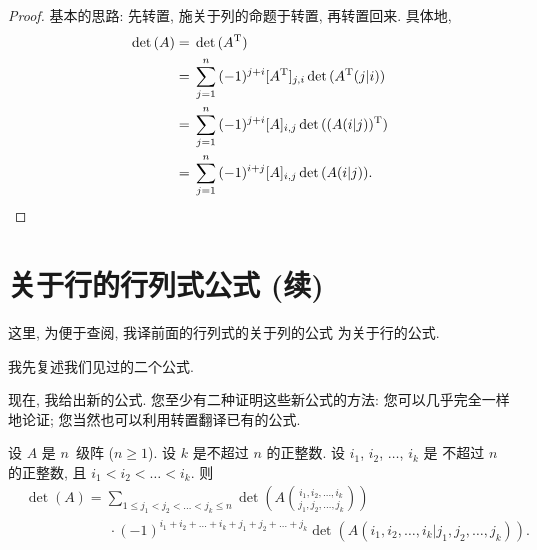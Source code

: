 \documentclass[%
    UTF8,%
    fontset=none,%
    punct=kaiming,%
    zihao=-4,%
    a4paper,%
    oneside,%
]{ctexbook}
\renewcommand*{\leq}{\leqslant}
\renewcommand*{\geq}{\geqslant}
\begin{document}
\begin{proof}
    基本的思路:
    先转置,
    施关于列的命题于转置,
    再转置回来.
    具体地,
    \begin{align*}
        \det {(A)}
        = {} & \det {(A^{\mathrm{T}})}
        \\
        = {} & \sum_{j = 1}^{n}
        {(-1)^{j+i} [A^{\mathrm{T}}]_{j,i}
        \det {(A^{\mathrm{T}}(j|i))}
        }
        \\
        = {} & \sum_{j = 1}^{n}
        {(-1)^{j+i} [A]_{i,j}
        \det {((A(i|j))^{\mathrm{T}})}
        }
        \\
        = {} & \sum_{j = 1}^{n}
        {(-1)^{i+j} [A]_{i,j}
        \det {(A(i|j))}
        }.
        \qedhere
    \end{align*}
\end{proof}

\section{关于行的行列式公式 (续)}

\OptionalReading

这里, 为便于查阅,
我译前面的行列式的关于列的公式%
为关于行的公式.

我先复述我们见过的二个公式.

\TheoremExpansionAboutRowOne*

\TheoremExpansionAboutAnyRow*

现在, 我给出新的公式.
您至少有二种证明这些新公式的方法:
您可以几乎完全一样地论证;
您当然也可以利用转置翻译已有的公式.

\begin{theorem}
    设 \(A\) 是 \(n\)~级阵 (\(n \geq 1\)).
    设 \(k\) 是不超过 \(n\) 的正整数.
    设 \(i_1\), \(i_2\), \(\dots\), \(i_k\) 是%
    不超过 \(n\) 的正整数,
    且 \(i_1 < i_2 < \dots < i_k\).
    则
    \begin{align*}
         &
        \det {(A)}
        = \sum_{1 \leq j_1 < j_2 < \dots < j_k \leq n}
        {\det {\left(
                A\binom{i_1, i_2, \dots, i_k}
                {j_1, j_2, \dots, j_k}
                \right)}}
        \\
         &
        \qquad \qquad \qquad
        \cdot (-1)^{i_1 + i_2 + \dots + i_k
            + j_1 + j_2 + \dots + j_k}
        \det {(A({i_1,i_2,\dots,i_k}|{j_1,j_2,\dots,j_k}))}.
    \end{align*}
\end{theorem}
\end{document}
